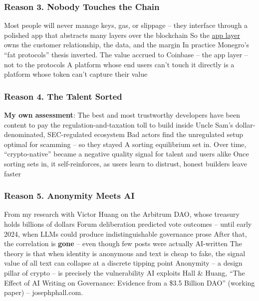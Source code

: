 \documentclass[aspectratio=169]{beamer}
\begin{document}
\begin{frame}
\frametitle{Reason 3. Nobody Touches the Chain}

\bi
\m Most people will never manage keys, gas, or slippage -- they interface through a polished app that abstracts many layers over the blockchain \pause
\m So the \ul{app layer} owns the customer relationship, the data, and the margin \pause
\m In practice Monegro's ``fat protocols'' thesis inverted. The value accrued to Coinbase -- the app layer -- not to the protocols 
\m A platform whose end users can't touch it directly is a platform whose token can't capture their value
\ei

\end{frame}

\begin{frame}
\frametitle{Reason 4. The Talent Sorted}

\bi
\m \textbf{My own assessment}: \pause
\m The best and most trustworthy developers have been content to pay the regulation-and-taxation toll to build inside Uncle Sam's dollar-denominated, SEC-regulated ecosystem \pause
\m Bad actors find the unregulated setup optimal for scamming -- so they stayed 
\m A sorting equilibrium set in. Over time, ``crypto-native'' became a negative quality signal for talent and users alike 
\m Once sorting sets in, it self-reinforces, as users learn to distrust, honest builders leave faster
\ei

\end{frame}

\begin{frame}
\frametitle{Reason 5. Anonymity Meets AI}

\bi
\m From my research with Victor Huang on the Arbitrum DAO, whose treasury holds billions of dollars \pause
\m Forum deliberation predicted vote outcomes -- until early 2024, when LLMs could produce indistinguishable governance prose \pause
\m After that, the correlation is \textbf{gone} -- even though few posts were actually AI-written 
\m The theory is that when identity is anonymous and text is cheap to fake, the signal value of all text can collapse at a discrete tipping point 
\m Anonymity -- a design pillar of crypto -- is precisely the vulnerability AI exploits
\ei
\vfill
{\scriptsize Hall \& Huang, ``The Effect of AI Writing on Governance: Evidence from a \$3.5 Billion DAO'' (working paper) -- josephphall.com.}

\end{frame}
\end{document}
